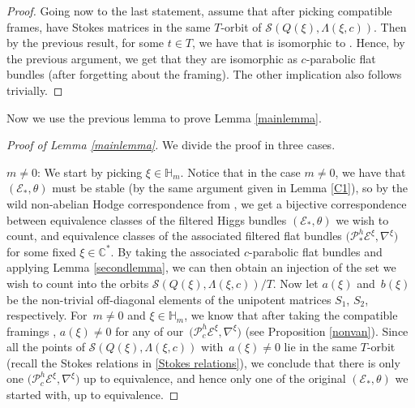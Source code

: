 \begin{proof}
Going now to the last statement, assume that after picking compatible frames,  have Stokes matrices in the same $T$-orbit of $\mathcal{S}(Q(\xi),\Lambda(\xi,c))$. Then by the previous result, for some $t\in T$, we have that  is isomorphic to . Hence, by the previous argument, we get that they are isomorphic as $c$-parabolic flat bundles (after forgetting about the framing). The other implication also follows trivially.
\end{proof}

Now we use the previous lemma to prove Lemma \ref{mainlemma}.
\begin{proof}[Proof of Lemma \ref{mainlemma}]
We divide the proof in three cases.

$m\neq 0$: We start by picking $\xi \in \mathbb{H}_m$. Notice that in the case $m\neq0$, we have that $(\mathcal{E}_*,\theta)$ must be stable (by the same argument given in Lemma \ref{C1}), so by the wild non-abelian Hodge correspondence from \cite{BB04}, we get a bijective correspondence between equivalence classes of the filtered Higgs bundles $(\mathcal{E}_*,\theta)$ we wish to count, and equivalence classes of the associated filtered flat bundles $\bigl(\mathcal{P}^h_{*}\mathcal{E}^{\xi},\nabla^{\xi}\bigr)$ for some fixed $\xi \in \mathbb{C}^*$. By taking the associated $c$-parabolic flat bundles and applying Lemma \ref{secondlemma}, we can then obtain an injection of the set we wish to count into the orbits $\mathcal{S}(Q(\xi),\Lambda(\xi,c))/T$. Now let $a(\xi)$ and~$b(\xi)$ be the non-trivial off-diagonal elements of the unipotent matrices $S_1$, $S_2$, respectively. For~${m\neq 0}$ and $\xi \in \mathbb{H}_m$, we know that after taking the compatible framings , $a(\xi)\neq 0$ for any of our~${\bigl(\mathcal{P}^h_{c}\mathcal{E}^{\xi},\nabla^{\xi}\bigr)}$ (see Proposition \ref{nonvan}). Since all the points of $\mathcal{S}(Q(\xi),\Lambda(\xi,c))$ with~${a(\xi)\neq 0}$ lie in the same $T$-orbit (recall the Stokes relations in \eqref{Stokes relations}), we conclude that there is only one $\bigl(\mathcal{P}^h_{c}\mathcal{E}^{\xi},\nabla^{\xi}\bigr)$ up to equivalence, and hence only one of the original $(\mathcal{E}_*,\theta)$ we started with, up to equivalence.


\end{proof}
